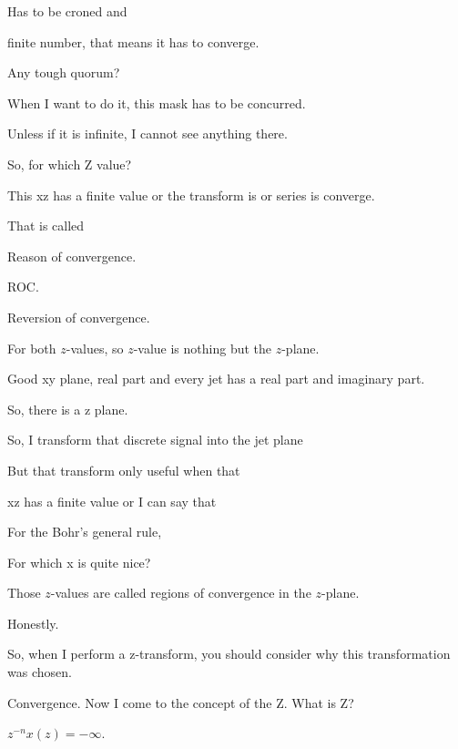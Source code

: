 \documentclass{article}
\begin{document}
Has to be croned and

finite number, that means it has to converge.

Any tough quorum?

When I want to do it, this mask has to be concurred.

Unless if it is infinite, I cannot see anything there.



So, for which Z value?

This xz has a finite value or the transform is or series is converge.

That is called

Reason of convergence.

ROC.

Reversion of convergence.

For both $z$-values, so $z$-value is nothing but the $z$-plane.

Good xy plane, real part and every jet has a real part and imaginary part.

So, there is a z plane.

So, I transform that discrete signal into the jet plane

But that transform only useful when that

xz has a finite value or I can say that

For the Bohr's general rule,

For which x is quite nice?

Those $z$-values are called regions of convergence in the $z$-plane.





Honestly.



So, when I perform a z-transform, you should consider why this transformation was chosen.

Convergence. Now I come to the concept of the Z. What is Z?



$z^{-n}x(z) = -\infty$.
\end{document}
